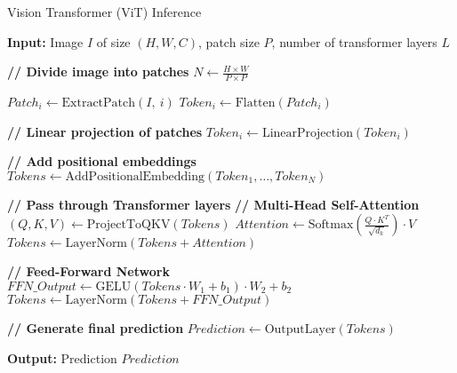 \begin{algorithm}
\caption{Vision Transformer (ViT) Inference}
\label{alg:vit_inference}
\noindent\textbf{Input:} Image $I$ of size $(H, W, C)$, patch size $P$, number of transformer layers $L$
\begin{algorithmic}[1]

\State \textbf{// Divide image into patches}
\State $N \gets \frac{H \times W}{P \times P}$

    \State $Patch_i \gets \text{ExtractPatch}(I,\ i)$
    \State $Token_i \gets \text{Flatten}(Patch_i)$
\EndFor

\State \textbf{// Linear projection of patches}
    \State $Token_i \gets \text{LinearProjection}(Token_i)$
\EndFor

\State \textbf{// Add positional embeddings}
\State $Tokens \gets \text{AddPositionalEmbedding}(Token_1, \dots, Token_N)$

\State \textbf{// Pass through Transformer layers}
    \State \textbf{// Multi-Head Self-Attention}
    \State $(Q, K, V) \gets \text{ProjectToQKV}(Tokens)$
    \State $Attention \gets \text{Softmax}\left( \frac{Q \cdot K^T}{\sqrt{d_k}} \right) \cdot V$
    \State $Tokens \gets \text{LayerNorm}(Tokens + Attention)$

    \State \textbf{// Feed-Forward Network}
    \State $FFN\_Output \gets \text{GELU}(Tokens \cdot W_1 + b_1) \cdot W_2 + b_2$
    \State $Tokens \gets \text{LayerNorm}(Tokens + FFN\_Output)$
\EndFor

\State \textbf{// Generate final prediction}
\State $Prediction \gets \text{OutputLayer}(Tokens)$

\end{algorithmic}
\noindent\textbf{Output:} Prediction $Prediction$
\end{algorithm}
